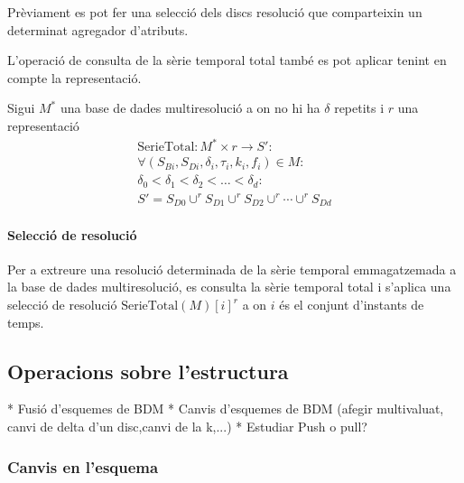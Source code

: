Prèviament es pot fer una selecció dels discs resolució que
comparteixin un determinat agregador d'atributs. 



L'operació de consulta de la sèrie temporal total també es pot aplicar
tenint en compte la representació.
\begin{definition}
  Sigui $M^*$ una base de dades multiresolució a on no hi ha $\delta$
  repetits i $r$ una representació
  \begin{gather*}
    \text{SerieTotal}: M^* \times r \longrightarrow S': \\
    \forall (S_{Bi},S_{Di},\delta_i,\tau_i,k_i,f_i) \in M : \\
    \delta_0 < \delta_1 < \delta_2 < \dots < \delta_d : \\
    S' = S_{D0} \cup^r S_{D1} \cup^r  S_{D2}  \cup^r \dotsb \cup^r  S_{Dd}
\end{gather*}
\end{definition}



\paragraph{Selecció de resolució}


Per a extreure una resolució determinada de la sèrie temporal
emmagatzemada a la base de dades multiresolució, es consulta la sèrie
temporal total i s'aplica una selecció de resolució
$\text{SerieTotal}(M)[i]^r$ a on $i$ és el conjunt d'instants de
temps.






\subsection{Operacions sobre l'estructura}

* Fusió d'esquemes de BDM
* Canvis d'esquemes de BDM (afegir multivaluat, canvi de delta d'un disc,canvi de la k,...)
* Estudiar Push o pull?



\subsubsection{Canvis en l'esquema}



